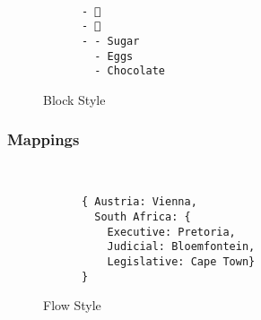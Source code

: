 \begin{figure}[H]
  \begin{minipage}[t]{0.48\textwidth}
    \vspace{0pt}
    \begin{bchart}[max=9, width=0.85\textwidth]
    \end{bchart}
  \end{minipage}
  \begin{minipage}[t]{0pt}~\end{minipage}
  \begin{minipage}[t]{0.48\textwidth}
    \vspace{0pt}
    \begin{verbatim}
      - 🍎
      - 🍊
      - - Sugar
        - Eggs
        - Chocolate
    \end{verbatim}
  \end{minipage}
  \caption{Block Style}
\end{figure}

\subsubsection{Mappings}

\begin{figure}[H]
  \begin{minipage}[t]{0.48\textwidth}
    \vspace{0pt}
    \begin{bchart}[max=9, width=0.85\textwidth]
    \end{bchart}
  \end{minipage}
  \begin{minipage}[t]{0pt}~\end{minipage}
  \begin{minipage}[t]{0.48\textwidth}
    \vspace{0pt}
    \begin{verbatim}
      { Austria: Vienna,
        South Africa: {
          Executive: Pretoria,
          Judicial: Bloemfontein,
          Legislative: Cape Town}
      }
    \end{verbatim}
  \end{minipage}
  \caption{Flow Style}
\end{figure}

